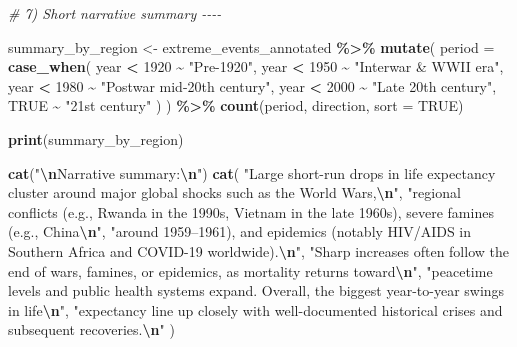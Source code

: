 \documentclass[
  11pt,
]{article}
\newenvironment{Shaded}{\begin{snugshade}}{\end{snugshade}}
\newcommand{\AttributeTok}[1]{\textcolor[rgb]{0.13,0.29,0.53}{#1}}
\newcommand{\CommentTok}[1]{\textcolor[rgb]{0.56,0.35,0.01}{\textit{#1}}}
\newcommand{\ConstantTok}[1]{\textcolor[rgb]{0.56,0.35,0.01}{#1}}
\newcommand{\DecValTok}[1]{\textcolor[rgb]{0.00,0.00,0.81}{#1}}
\newcommand{\FunctionTok}[1]{\textcolor[rgb]{0.13,0.29,0.53}{\textbf{#1}}}
\newcommand{\NormalTok}[1]{#1}
\newcommand{\OtherTok}[1]{\textcolor[rgb]{0.56,0.35,0.01}{#1}}
\newcommand{\SpecialCharTok}[1]{\textcolor[rgb]{0.81,0.36,0.00}{\textbf{#1}}}
\newcommand{\StringTok}[1]{\textcolor[rgb]{0.31,0.60,0.02}{#1}}
\begin{document}
\begin{Shaded}
\begin{Highlighting}[]
\CommentTok{\# 7) Short narrative summary {-}{-}{-}{-}}

\NormalTok{summary\_by\_region }\OtherTok{\textless{}{-}}\NormalTok{ extreme\_events\_annotated }\SpecialCharTok{\%\textgreater{}\%}
  \FunctionTok{mutate}\NormalTok{(}
    \AttributeTok{period =} \FunctionTok{case\_when}\NormalTok{(}
\NormalTok{      year }\SpecialCharTok{\textless{}} \DecValTok{1920} \SpecialCharTok{\textasciitilde{}} \StringTok{"Pre{-}1920"}\NormalTok{,}
\NormalTok{      year }\SpecialCharTok{\textless{}} \DecValTok{1950} \SpecialCharTok{\textasciitilde{}} \StringTok{"Interwar \& WWII era"}\NormalTok{,}
\NormalTok{      year }\SpecialCharTok{\textless{}} \DecValTok{1980} \SpecialCharTok{\textasciitilde{}} \StringTok{"Postwar mid{-}20th century"}\NormalTok{,}
\NormalTok{      year }\SpecialCharTok{\textless{}} \DecValTok{2000} \SpecialCharTok{\textasciitilde{}} \StringTok{"Late 20th century"}\NormalTok{,}
      \ConstantTok{TRUE} \SpecialCharTok{\textasciitilde{}} \StringTok{"21st century"}
\NormalTok{    )}
\NormalTok{  ) }\SpecialCharTok{\%\textgreater{}\%}
  \FunctionTok{count}\NormalTok{(period, direction, }\AttributeTok{sort =} \ConstantTok{TRUE}\NormalTok{)}

\FunctionTok{print}\NormalTok{(summary\_by\_region)}

\FunctionTok{cat}\NormalTok{(}\StringTok{"}\SpecialCharTok{\textbackslash{}n}\StringTok{Narrative summary:}\SpecialCharTok{\textbackslash{}n}\StringTok{"}\NormalTok{)}
\FunctionTok{cat}\NormalTok{(}
  \StringTok{"Large short{-}run drops in life expectancy cluster around major global shocks such as the World Wars,}\SpecialCharTok{\textbackslash{}n}\StringTok{"}\NormalTok{,}
  \StringTok{"regional conflicts (e.g., Rwanda in the 1990s, Vietnam in the late 1960s), severe famines (e.g., China}\SpecialCharTok{\textbackslash{}n}\StringTok{"}\NormalTok{,}
  \StringTok{"around 1959–1961), and epidemics (notably HIV/AIDS in Southern Africa and COVID{-}19 worldwide).}\SpecialCharTok{\textbackslash{}n}\StringTok{"}\NormalTok{,}
  \StringTok{"Sharp increases often follow the end of wars, famines, or epidemics, as mortality returns toward}\SpecialCharTok{\textbackslash{}n}\StringTok{"}\NormalTok{,}
  \StringTok{"peacetime levels and public health systems expand. Overall, the biggest year{-}to{-}year swings in life}\SpecialCharTok{\textbackslash{}n}\StringTok{"}\NormalTok{,}
  \StringTok{"expectancy line up closely with well{-}documented historical crises and subsequent recoveries.}\SpecialCharTok{\textbackslash{}n}\StringTok{"}
\NormalTok{)}
\end{Highlighting}
\end{Shaded}
\end{document}
